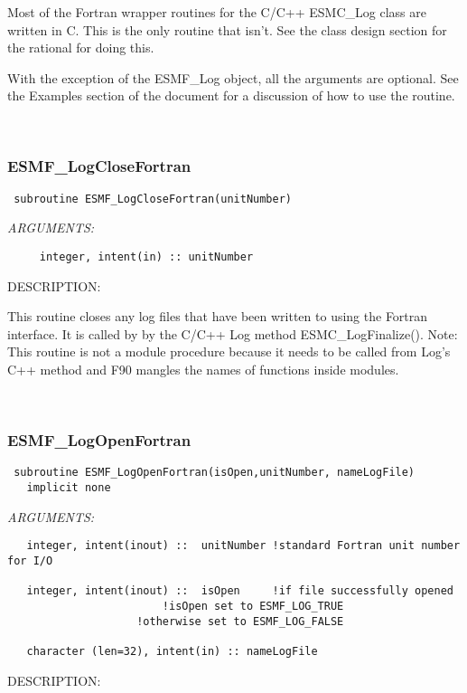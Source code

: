      Most of the Fortran wrapper routines for the C/C++ ESMC\_Log class are
     written in C. This is the only routine that isn't. See the class design
     section for the rational for doing this. 
  
     With the exception of the ESMF\_Log object, all the arguments are optional.
     See the Examples section of the document for a discussion of how to use the
     routine.
   
 
\mbox{}\hrulefill\ 
 
\subsubsection [ESMF\_LogCloseFortran] {ESMF\_LogCloseFortran}


  
\begin{verbatim} subroutine ESMF_LogCloseFortran(unitNumber)\end{verbatim}{\em ARGUMENTS:}
\begin{verbatim}     integer, intent(in) :: unitNumber\end{verbatim}
{\sf DESCRIPTION:\\ }


   This routine closes any log files that have been written to using
   the Fortran interface.  It is called by by the C/C++ Log
   method ESMC\_LogFinalize().
   Note: This routine is not a module procedure
   because it needs to be called from Log's C++ method and
   F90 mangles the names of functions
   inside modules.
   
 
\mbox{}\hrulefill\ 
 
\subsubsection [ESMF\_LogOpenFortran] {ESMF\_LogOpenFortran}


  
\begin{verbatim} subroutine ESMF_LogOpenFortran(isOpen,unitNumber, nameLogFile)
   implicit none\end{verbatim}{\em ARGUMENTS:}
\begin{verbatim}   integer, intent(inout) ::  unitNumber !standard Fortran unit number for I/O
 
   integer, intent(inout) ::  isOpen     !if file successfully opened
 				        !isOpen set to ESMF_LOG_TRUE	
 					!otherwise set to ESMF_LOG_FALSE
 
   character (len=32), intent(in) :: nameLogFile
      \end{verbatim}
{\sf DESCRIPTION:\\ }


